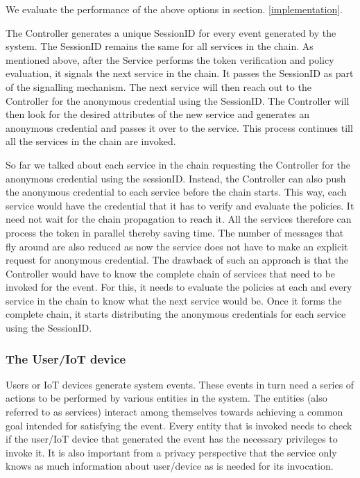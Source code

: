 \documentclass[journal]{IEEEtran}
\begin{document}
We evaluate the performance of the above options in section. \ref{implementation}.

The Controller generates a unique SessionID for every event generated by the system. The SessionID remains the same for all services in the chain. As mentioned above, after the Service performs the token verification and policy evaluation, it signals the next service in the chain. It passes the SessionID as part of the signalling mechanism. The next service will then reach out to the Controller for the anonymous credential using the SessionID. The Controller will then look for the desired attributes of the new service and generates an anonymous credential and passes it over to the service. This process continues till all the services in the chain are invoked.

So far we talked about each service in the chain requesting the Controller for the anonymous credential using the sessionID. Instead, the Controller can also push the anonymous credential to each service before the chain starts. This way, each service would have the credential that it has to verify and evaluate the policies. It need not wait for the chain propagation to reach it. All the services therefore can process the token in parallel thereby saving time. The number of messages that fly around are also reduced as now the service does not have to make an explicit request for anonymous credential. The drawback of such an approach is that the Controller would have to know the complete chain of services that need to be invoked for the event. For this, it needs to evaluate the policies at each and every service in the chain to know what the next service would be. Once it forms the complete chain, it starts distributing the anonymous credentials for each service using the SessionID. 

\subsubsection{The User/IoT device} \label{iotdevice}
Users or IoT devices generate system events. These events in turn need a series of actions to be performed by various entities in the system. The entities (also referred to as services) interact among themselves towards achieving a common goal intended for satisfying the event. Every entity that is invoked needs to check if the user/IoT device that generated the event has the necessary privileges to invoke it. It is also important from a privacy perspective that the service only knows as much information about user/device as is needed for its invocation. 
\end{document}
